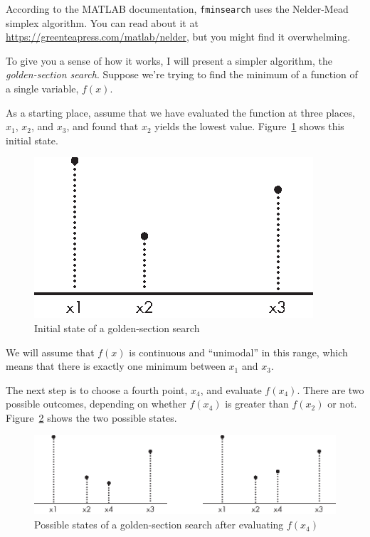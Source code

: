 According to the MATLAB documentation, \lstinline{fminsearch} uses the Nelder-Mead simplex algorithm.  You can read about it at \url{https://greenteapress.com/matlab/nelder}, but you might find it overwhelming.


To give you a sense of how it works, I will present a simpler algorithm, the \emph{golden-section search}.  Suppose we're trying to find the minimum of a function of a single variable, $f(x)$.

As a starting place, assume that we have evaluated the function at three places,
$x_1$, $x_2$, and $x_3$, and found that $x_2$ yields the lowest
value. Figure~\ref{fig:golden1} shows this initial state.

\begin{figure}[ht]
\centerline{\includegraphics{book/images/figure15_04_new.eps}}
\caption{Initial state of a golden-section search}
\label{fig:golden1}
\end{figure}

We will assume that $f(x)$ is continuous and ``unimodal'' in this range, which means that there is exactly one minimum between $x_1$ and $x_3$.


The next step is to choose a fourth point, $x_4$, and evaluate
$f(x_4)$.  There are two possible outcomes, depending on whether
$f(x_4)$ is greater than $f(x_2)$ or not.
Figure~\ref{fig:golden2} shows the two possible states.

\begin{figure}[ht]
\centerline{\includegraphics{book/images/figure15_05_new.eps}}
\caption{Possible states of a golden-section search after evaluating $f(x_4)$}
\label{fig:golden2}
\end{figure}

